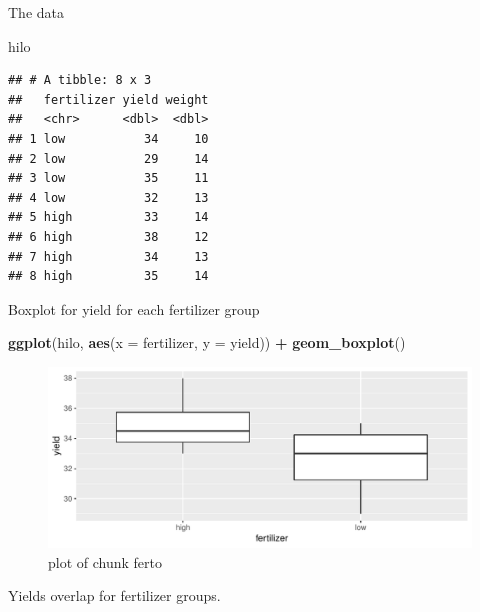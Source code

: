 \documentclass[ignorenonframetext,]{beamer}
\newenvironment{Shaded}{\begin{snugshade}}{\end{snugshade}}
\newcommand{\DataTypeTok}[1]{\textcolor[rgb]{0.13,0.29,0.53}{#1}}
\newcommand{\KeywordTok}[1]{\textcolor[rgb]{0.13,0.29,0.53}{\textbf{#1}}}
\newcommand{\NormalTok}[1]{#1}
\newcommand{\OperatorTok}[1]{\textcolor[rgb]{0.81,0.36,0.00}{\textbf{#1}}}
\newcommand{\StringTok}[1]{\textcolor[rgb]{0.31,0.60,0.02}{#1}}
\begin{document}
\begin{frame}[fragile]{The data}
\protect\hypertarget{the-data-9}{}

\begin{Shaded}
\begin{Highlighting}[]
\NormalTok{hilo}
\end{Highlighting}
\end{Shaded}

\begin{verbatim}
## # A tibble: 8 x 3
##   fertilizer yield weight
##   <chr>      <dbl>  <dbl>
## 1 low           34     10
## 2 low           29     14
## 3 low           35     11
## 4 low           32     13
## 5 high          33     14
## 6 high          38     12
## 7 high          34     13
## 8 high          35     14
\end{verbatim}

\end{frame}

\begin{frame}[fragile]{Boxplot for yield for each fertilizer group}
\protect\hypertarget{boxplot-for-yield-for-each-fertilizer-group}{}

\begin{Shaded}
\begin{Highlighting}[]
\KeywordTok{ggplot}\NormalTok{(hilo, }\KeywordTok{aes}\NormalTok{(}\DataTypeTok{x =}\NormalTok{ fertilizer, }\DataTypeTok{y =}\NormalTok{ yield)) }\OperatorTok{+}\StringTok{ }\KeywordTok{geom_boxplot}\NormalTok{()}
\end{Highlighting}
\end{Shaded}

\begin{figure}
\centering
\includegraphics{figure/ferto-1.pdf}
\caption{plot of chunk ferto}
\end{figure}

Yields overlap for fertilizer groups.

\end{frame}
\end{document}

